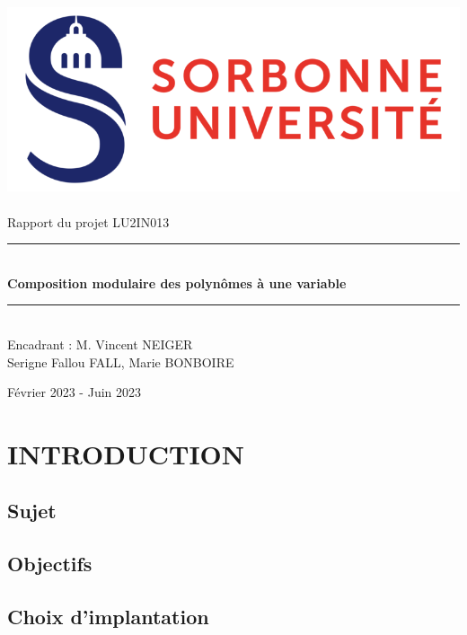 \documentclass[a4paper]{article}
\begin{document}
\thispagestyle{plain}

\begin{titlepage}
    \begin{center}

        \bigskip
	\includegraphics[scale=0.5]{logo_su.jpg}~\\[4cm]

        {\LARGE Rapport du projet LU2IN013}\\[0.3cm]
        \rule{\linewidth}{0.5mm} \\[0.6cm]
        {\huge \textbf{Composition modulaire des polynômes à une variable}}\\[0.4cm]
        \rule{\linewidth}{0.5mm} \\[1cm]
        {\large Encadrant : M. Vincent NEIGER}\\[5cm]

        {\Large Serigne Fallou FALL, Marie BONBOIRE}
        
        \vfill
        Février 2023 - Juin 2023


    \end{center}
\end{titlepage}

\newpage

\tableofcontents

\newpage


\section{INTRODUCTION}
\subsection{Sujet}
\subsection{Objectifs}
\subsection{Choix d'implantation}
\end{document}
